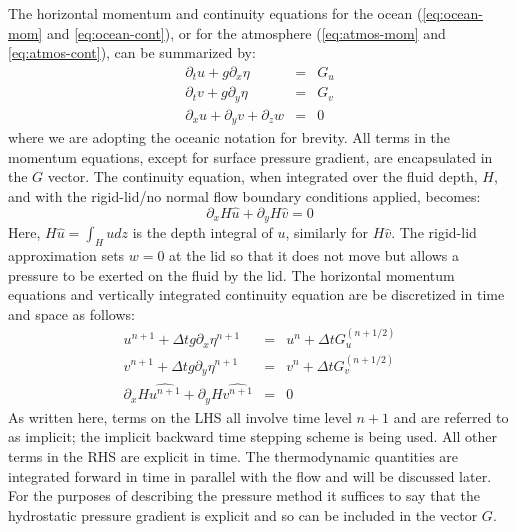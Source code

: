 The horizontal momentum and continuity equations for the ocean
(\ref{eq:ocean-mom} and \ref{eq:ocean-cont}), or for the atmosphere
(\ref{eq:atmos-mom} and \ref{eq:atmos-cont}), can be summarized by:
\begin{eqnarray}
\partial_t u + g \partial_x \eta & = & G_u \\
\partial_t v + g \partial_y \eta & = & G_v \\
\partial_x u + \partial_y v + \partial_z w & = & 0
\end{eqnarray}
where we are adopting the oceanic notation for brevity. All terms in
the momentum equations, except for surface pressure gradient, are
encapsulated in the $G$ vector. The continuity equation, when
integrated over the fluid depth, $H$, and with the rigid-lid/no normal
flow boundary conditions applied, becomes:
\begin{equation}
\partial_x H \widehat{u} + \partial_y H \widehat{v} = 0
\label{eq:rigid-lid-continuity}
\end{equation}
Here, $H\widehat{u} = \int_H u dz$ is the depth integral of $u$,
similarly for $H\widehat{v}$. The rigid-lid approximation sets $w=0$
at the lid so that it does not move but allows a pressure to be
exerted on the fluid by the lid. The horizontal momentum equations and
vertically integrated continuity equation are be discretized in time
and space as follows:
\begin{eqnarray}
u^{n+1} + \Delta t g \partial_x \eta^{n+1}
& = & u^{n} + \Delta t G_u^{(n+1/2)}
\label{eq:discrete-time-u}
\\
v^{n+1} + \Delta t g \partial_y \eta^{n+1}
& = & v^{n} + \Delta t G_v^{(n+1/2)}
\label{eq:discrete-time-v}
\\
  \partial_x H \widehat{u^{n+1}}
+ \partial_y H \widehat{v^{n+1}} & = & 0
\label{eq:discrete-time-cont-rigid-lid}
\end{eqnarray}
As written here, terms on the LHS all involve time level $n+1$ and are
referred to as implicit; the implicit backward time stepping scheme is
being used. All other terms in the RHS are explicit in time. The
thermodynamic quantities are integrated forward in time in parallel
with the flow and will be discussed later. For the purposes of
describing the pressure method it suffices to say that the hydrostatic
pressure gradient is explicit and so can be included in the vector
$G$.

